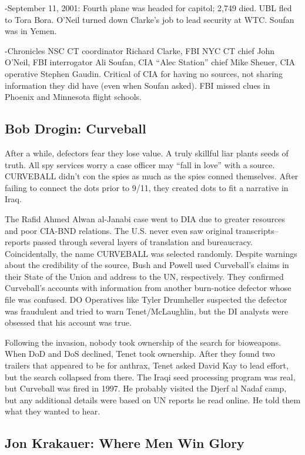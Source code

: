 \documentclass[
]{article}
\begin{document}
-September 11, 2001: Fourth plane was headed for capitol; 2,749 died.
UBL fled to Tora Bora. O'Neil turned down Clarke's job to lead security
at WTC. Soufan was in Yemen.

-Chronicles NSC CT coordinator Richard Clarke, FBI NYC CT chief John
O'Neil, FBI interrogator Ali Soufan, CIA ``Alec Station'' chief Mike
Sheuer, CIA operative Stephen Gaudin. Critical of CIA for having no
sources, not sharing information they did have (even when Soufan asked).
FBI missed clues in Phoenix and Minnesota flight schools.

\hypertarget{bob-drogin-curveball}{%
\subsection{Bob Drogin: Curveball}\label{bob-drogin-curveball}}

After a while, defectors fear they lose value. A truly skillful liar
plants seeds of truth. All spy services worry a case officer may ``fall
in love'' with a source. CURVEBALL didn't con the spies as much as the
spies conned themselves. After failing to connect the dots prior to
9/11, they created dots to fit a narrative in Iraq.

The Rafid Ahmed Alwan al-Janabi case went to DIA due to greater
resources and poor CIA-BND relations. The U.S. never even saw original
transcripts--reports passed through several layers of translation and
bureaucracy. Coincidentally, the name CURVEBALL was selected randomly.
Despite warnings about the credibility of the source, Bush and Powell
used Curveball's claims in their State of the Union and address to the
UN, respectively. They confirmed Curveball's accounts with information
from another burn-notice defector whose file was confused. DO Operatives
like Tyler Drumheller suspected the defector was fraudulent and tried to
warn Tenet/McLaughlin, but the DI analysts were obsessed that his
account was true.

Following the invasion, nobody took ownership of the search for
bioweapons. When DoD and DoS declined, Tenet took ownership. After they
found two trailers that appeared to be for anthrax, Tenet asked David
Kay to lead effort, but the search collapsed from there. The Iraqi seed
processing program was real, but Curveball was fired in 1997. He
probably visited the Djerf al Nadaf camp, but any additional details
were based on UN reports he read online. He told them what they wanted
to hear.

\hypertarget{jon-krakauer-where-men-win-glory}{%
\subsection{Jon Krakauer: Where Men Win
Glory}\label{jon-krakauer-where-men-win-glory}}
\end{document}
